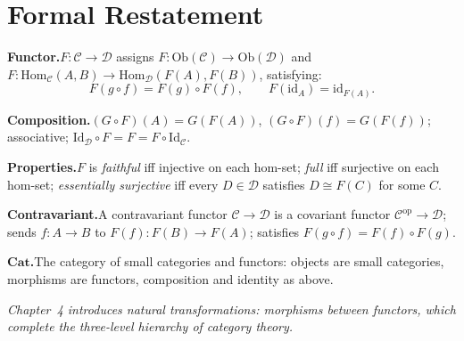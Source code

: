 \section*{Formal Restatement}

\begin{formalrestatement}
\textbf{Functor.}\quad $F : \mathcal{C} \to \mathcal{D}$ assigns
$F : \mathrm{Ob}(\mathcal{C}) \to \mathrm{Ob}(\mathcal{D})$ and
$F : \mathrm{Hom}_\mathcal{C}(A,B) \to \mathrm{Hom}_\mathcal{D}(F(A),F(B))$,
satisfying:
\[
  F(g \circ f) = F(g) \circ F(f), \qquad F(\mathrm{id}_A) = \mathrm{id}_{F(A)}.
\]

\medskip
\textbf{Composition.}\quad $(G \circ F)(A) = G(F(A))$, $(G \circ F)(f) =
G(F(f))$; associative; $\mathrm{Id}_\mathcal{D} \circ F = F =
F \circ \mathrm{Id}_\mathcal{C}$.

\medskip
\textbf{Properties.}\quad $F$ is \emph{faithful} iff injective on each
hom-set; \emph{full} iff surjective on each hom-set; \emph{essentially
surjective} iff every $D \in \mathcal{D}$ satisfies $D \cong F(C)$ for some
$C$.

\medskip
\textbf{Contravariant.}\quad A contravariant functor $\mathcal{C} \to
\mathcal{D}$ is a covariant functor $\mathcal{C}^{\mathrm{op}} \to
\mathcal{D}$; sends $f : A \to B$ to $F(f) : F(B) \to F(A)$; satisfies
$F(g \circ f) = F(f) \circ F(g)$.

\medskip
\textbf{$\mathbf{Cat}$.}\quad The category of small categories and functors:
objects are small categories, morphisms are functors, composition and identity
as above.

\medskip
\noindent\textit{Chapter~4 introduces natural transformations: morphisms
between functors, which complete the three-level hierarchy of category theory.}
\end{formalrestatement}
